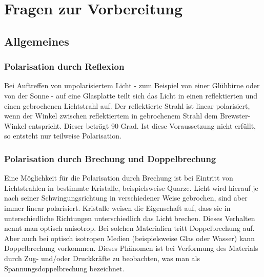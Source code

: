 

\chapter{Fragen zur Vorbereitung}
\label{chap:fvz}



\section{Allgemeines}

\subsection*{Polarisation durch Reflexion}
Bei Auftreffen von unpolarisiertem Licht - zum Beispiel von einer Glühbirne oder von der Sonne - auf eine Glasplatte teilt sich das Licht in einen reflektierten und einen gebrochenen Lichtstrahl auf. 
Der reflektierte Strahl ist  linear polarisiert, wenn der Winkel zwischen reflektiertem in gebrochenem Strahl dem Brewster-Winkel entspricht. Dieser beträgt 90 Grad. Ist diese Voraussetzung nicht erfüllt, so entsteht nur teilweise Polarisation. 

\subsection*{Polarisation durch Brechung und Doppelbrechung}
Eine Möglichkeit für die Polarisation durch Brechung ist bei Eintritt von Lichtstrahlen in bestimmte Kristalle, beispielsweise Quarze. Licht wird hierauf je nach seiner Schwingungsrichtung in verschiedener Weise gebrochen, sind aber immer linear polarisiert. 
Kristalle weisen die Eigenschaft auf, dass sie in unterschiedliche Richtungen unterschiedlich das Licht brechen. Dieses Verhalten nennt man optisch anisotrop. Bei solchen Materialien tritt Doppelbrechung auf. Aber auch bei optisch isotropen Medien (beispielsweise Glas oder Wasser) kann Doppelbrechung vorkommen. Dieses Phänomen ist  bei Verformung des Materials durch Zug- und/oder Druckkräfte zu beobachten, was man als Spannungsdoppelbrechung bezeichnet. 

